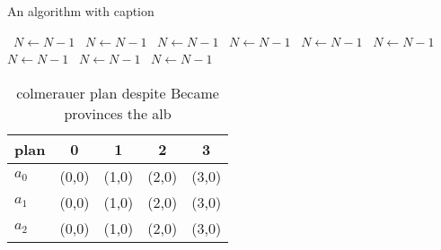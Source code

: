 \documentclass[a4paper]{article}
\begin{document}
\begin{algorithm}
\caption{An algorithm with caption}
\begin{algorithmic}
\    \State $N \gets N - 1$
\    \State $N \gets N - 1$
\    \State $N \gets N - 1$
\    \State $N \gets N - 1$
\    \State $N \gets N - 1$
\    \State $N \gets N - 1$
\    \State $N \gets N - 1$
\    \State $N \gets N - 1$
\    \State $N \gets N - 1$
\EndWhile
\end{algorithmic}
\end{algorithm}

\begin{table}
\begin{adjustbox}{width=0.5\columnwidth}
\begin{tabular}{|l|l|l|l|l|}
\hline
\textbf{plan} & \multicolumn{1}{c|}{\textbf{0}} & \multicolumn{1}{c|}{\textbf{1}} & \multicolumn{1}{c|}{\textbf{2}} & \multicolumn{1}{c|}{\textbf{3}} \\ \hline
\textbf{$a_0$}  & (0,0) & (1,0) & (2,0) & (3,0) \\ \hline
\textbf{$a_1$}  & (0,0) & (1,0) & (2,0) & (3,0) \\ \hline
\textbf{$a_2$}  & (0,0) & (1,0) & (2,0) & (3,0) \\ \hline
\end{tabular}
\end{adjustbox}
\caption{ colmerauer plan despite Became provinces the alb
}
\end{table}
\end{document}
